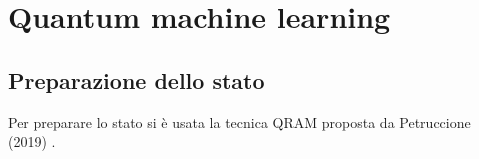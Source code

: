 \chapter{Quantum machine learning}\label{ch:qml}

\section{Preparazione dello stato}

Per preparare lo stato si è usata la tecnica QRAM proposta da Petruccione (2019) 
\cite{petruccione}. 

